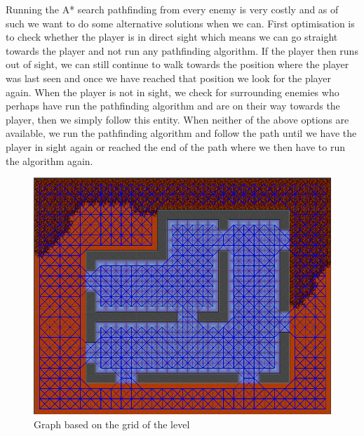 Running the A* search pathfinding from every enemy is very costly and as of such we want to do some alternative solutions when we can.
First optimisation is to check whether the player is in direct sight which means we can go straight towards the player and not run any pathfinding algorithm.
If the player then runs out of sight, we can still continue to walk towards the position where the player was last seen and once we have reached that position we look for the player again.
When the player is not in sight, we check for surrounding enemies who perhaps have run the pathfinding algorithm and are on their way towards the player, then we simply follow this entity.
When neither of the above options are available, we run the pathfinding algorithm and follow the path until we have the player in sight again or reached the end of the path where we then have to run the algorithm again.




\begin{figure}
	\includegraphics[width=\textwidth]{figures/astar/gridGraph}
	\caption{Graph based on the grid of the level}
	\label{gridGraph}
\end{figure}

